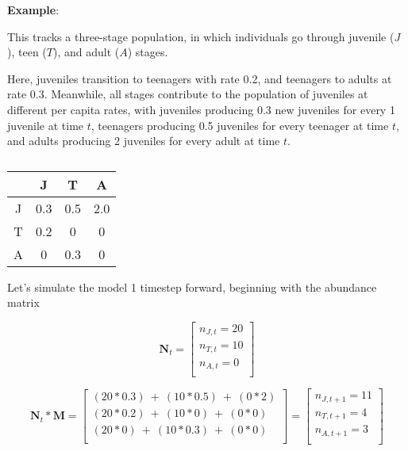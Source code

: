 \documentclass[12pt]{article}
\begin{document}
\bigskip









\textbf{Example}:

This tracks a three-stage population, in which individuals go through juvenile ($J$), teen ($T$), and adult ($A$) stages. 

Here, juveniles transition to teenagers with rate 0.2, and teenagers to adults at rate 0.3. Meanwhile, all stages contribute to the population of juveniles at different per capita rates, with juveniles producing 0.3 new juveniles for every 1 juvenile at time $t$, teenagers producing 0.5 juveniles for every teenager at time $t$, and adults producing 2 juveniles for every adult at time $t$. 



\begin{table}[h!]
\centering
\caption{}
\vspace{0.5cm}
\begin{tabular}{cccc}
& J & T & A \\
  \hline
J & 0.3  & 0.5  & 2.0 \\
T & 0.2  & 0    & 0   \\
A & 0    & 0.3  & 0 \\
\hline
\end{tabular}
\end{table}


Let's simulate the model 1 timestep forward, beginning with the abundance matrix 


\begin{equation*}
\mathbf{N}_{t}= \begin{bmatrix}
n_{J, t} = 20 \\ 
n_{T, t} = 10 \\ 
n_{A, t} = 0  \\
\end{bmatrix}
\end{equation*}




\begin{equation}
\mathbf{N}_{t} * \mathbf{M} = \begin{bmatrix}
(20 * 0.3) \ + \ (10 * 0.5) \ + \ (0 * 2)     \\
(20 * 0.2) \ + \ (10 * 0 ) \ + \ (0 * 0)    \\
(20 * 0 ) \ + \ (10 * 0.3) \ + \ (0 * 0)   \\
\end{bmatrix} = \begin{bmatrix}
n_{J, t+1} = 11 \\ 
n_{T, t+1} =  4 \\ 
n_{A, t+1} =  3 \\
\end{bmatrix}
\end{equation}
\end{document}
